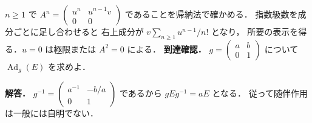 \documentclass[a5paper,10pt,onecolumn]{jsarticle}
\makeatletter
\theoremstyle{mathnotetheorem}
\renewcommand{\proofname}{証明}
\renewenvironment{proof}[1][\proofname]{%
  \par\pushQED{\qed}\normalfont\topsep4\p@\@plus2\p@\relax
  \trivlist\item[\hskip\labelsep\bfseries #1]\ignorespaces
}{\popQED\endtrivlist\@endpefalse}
\makeatother
\begin{document}
\begin{proof}
$n\ge1$ で
$A^n=\left(\begin{smallmatrix}u^n&u^{n-1}v\\0&0\end{smallmatrix}\right)$
であることを帰納法で確かめる．
指数級数を成分ごとに足し合わせると
右上成分が
$v\sum_{n\ge1}u^{n-1}/n!$ となり，
所要の表示を得る．$u=0$ は極限または
$A^2=0$ による．
\end{proof}
\noindent\textbf{到達確認．}
$g=\left(\begin{smallmatrix}a&b\\0&1\end{smallmatrix}\right)$
について $\operatorname{Ad}_g(E)$ を求めよ．
\par\noindent\textbf{解答．}
$g^{-1}=\left(\begin{smallmatrix}a^{-1}&-b/a\\0&1\end{smallmatrix}\right)$
であるから
$gEg^{-1}=aE$ となる．
従って随伴作用は一般には自明でない．
\end{document}
